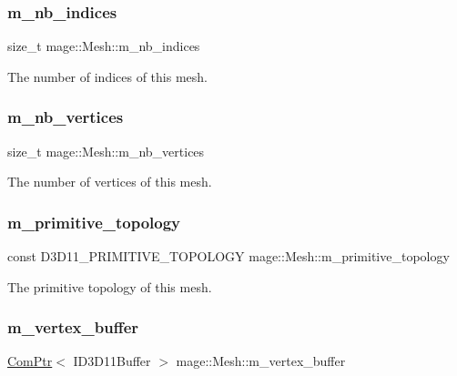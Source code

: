 \subsubsection{\texorpdfstring{m\+\_\+nb\+\_\+indices}{m\_nb\_indices}}
{\footnotesize\ttfamily size\+\_\+t mage\+::\+Mesh\+::m\+\_\+nb\+\_\+indices\hspace{0.3cm}{\ttfamily [private]}}

The number of indices of this mesh. \hypertarget{classmage_1_1_mesh_a5a04aa73e98c75dd5b8929296c3af9bb}{}\label{classmage_1_1_mesh_a5a04aa73e98c75dd5b8929296c3af9bb} 
\subsubsection{\texorpdfstring{m\+\_\+nb\+\_\+vertices}{m\_nb\_vertices}}
{\footnotesize\ttfamily size\+\_\+t mage\+::\+Mesh\+::m\+\_\+nb\+\_\+vertices\hspace{0.3cm}{\ttfamily [private]}}

The number of vertices of this mesh. \hypertarget{classmage_1_1_mesh_a329fab0ad24e11b73a8981c6d09a0c7c}{}\label{classmage_1_1_mesh_a329fab0ad24e11b73a8981c6d09a0c7c} 
\subsubsection{\texorpdfstring{m\+\_\+primitive\+\_\+topology}{m\_primitive\_topology}}
{\footnotesize\ttfamily const D3\+D11\+\_\+\+P\+R\+I\+M\+I\+T\+I\+V\+E\+\_\+\+T\+O\+P\+O\+L\+O\+GY mage\+::\+Mesh\+::m\+\_\+primitive\+\_\+topology\hspace{0.3cm}{\ttfamily [private]}}

The primitive topology of this mesh. \hypertarget{classmage_1_1_mesh_af5ae74887eb330201829477cf772ba6e}{}\label{classmage_1_1_mesh_af5ae74887eb330201829477cf772ba6e} 
\subsubsection{\texorpdfstring{m\+\_\+vertex\+\_\+buffer}{m\_vertex\_buffer}}
{\footnotesize\ttfamily \hyperlink{namespacemage_ae74f374780900893caa5555d1031fd79}{Com\+Ptr}$<$ I\+D3\+D11\+Buffer $>$ mage\+::\+Mesh\+::m\+\_\+vertex\+\_\+buffer\hspace{0.3cm}{\ttfamily [protected]}}

